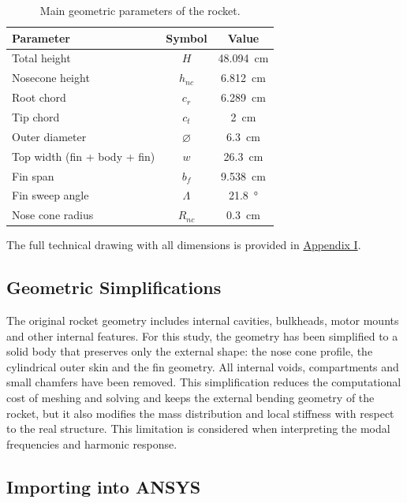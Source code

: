 \begin{table}[H]
\centering
\caption{Main geometric parameters of the rocket.}
\label{tab:geometry_parameters}
\begin{tabular}{lcc}
\toprule
Parameter & Symbol & Value \\
\midrule
Total height & $H$ & \SI{48.094}{\centi\metre} \\
Nosecone height & $h_{nc}$ & \SI{6.812}{\centi\metre} \\
Root chord & $c_r$ & \SI{6.289}{\centi\metre} \\
Tip chord & $c_t$ & \SI{2}{\centi\metre} \\
Outer diameter & $\varnothing$ & \SI{6.3}{\centi\metre} \\
Top width (fin + body + fin) & $w$ & \SI{26.3}{\centi\metre} \\
Fin span & $b_f$ & \SI{9.538}{\centi\metre} \\
Fin sweep angle & $\Lambda$ & \SI{21.8}{\degree} \\
Nose cone radius & $R_{nc}$ & \SI{0.3}{\centi\metre} \\
\bottomrule
\end{tabular}
\end{table}

The full technical drawing with all dimensions is provided in \hyperref[app:rocket_drawing]{Appendix I}.

\subsection{Geometric Simplifications}

The original rocket geometry includes internal cavities, bulkheads, motor mounts and other internal features. For this study, the geometry has been simplified to a solid body that preserves only the external shape: the nose cone profile, the cylindrical outer skin and the fin geometry. All internal voids, compartments and small chamfers have been removed. This simplification reduces the computational cost of meshing and solving and keeps the external bending geometry of the rocket, but it also modifies the mass distribution and local stiffness with respect to the real structure. This limitation is considered when interpreting the modal frequencies and harmonic response.

\subsection{Importing into ANSYS}

